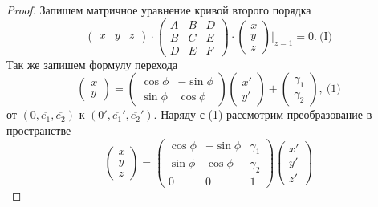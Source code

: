     \begin{proof}
        Запишем матричное уравнение кривой второго порядка
        \[\begin{pmatrix}
            x & y & z
        \end{pmatrix} \cdot \begin{pmatrix}
            A & B & D \\
            B & C & E \\
            D & E & F
        \end{pmatrix} \cdot \begin{pmatrix}
            x \\
            y \\
            z
        \end{pmatrix}\bigg|_{z = 1} = 0. \ \text{(I)}\]
        Так же запишем формулу перехода
        \[\begin{pmatrix}
    		x\\ y
            \end{pmatrix} = \begin{pmatrix}
                \cos\phi & -\sin\phi \\
                \sin\phi & \cos\phi
            \end{pmatrix} \begin{pmatrix}
    		x'\\ y'
            \end{pmatrix} + \begin{pmatrix}
    		\gamma_{1}\\ \gamma_{2}
            \end{pmatrix}, \ \text{(1)}\]
        от $(0, \overline{e_{1}}, \overline{e_{2}})$ к $(0', \overline{e_{1}}', \overline{e_{2}}')$. Наряду с (1) рассмотрим преобразование в пространстве
        \[\begin{pmatrix}
    		x \\
                y \\
                z
            \end{pmatrix} =  \begin{pmatrix}
                \cos\phi & -\sin\phi & \gamma_1 \\
                \sin\phi & \cos\phi & \gamma_2 \\
                0 & 0 & 1
            \end{pmatrix} \begin{pmatrix}
    		x' \\
                y' \\
                z'

\end{pmatrix}\]
\end{proof}
